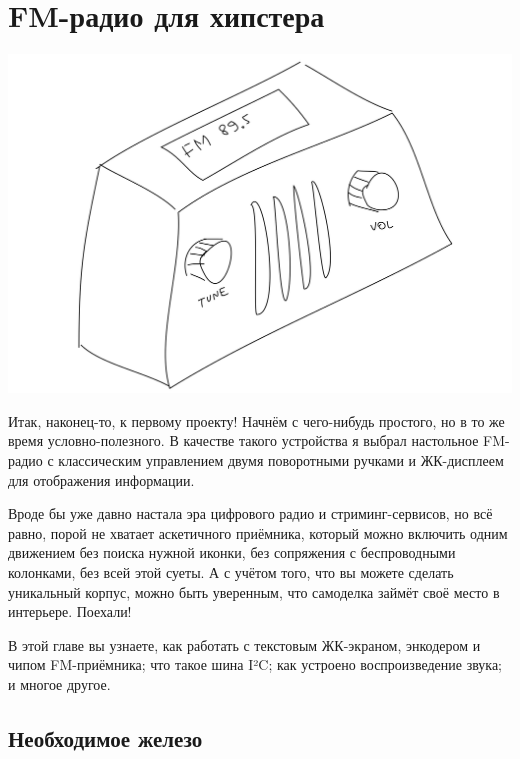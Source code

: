 \chapter{FM-радио для хипстера}

\includegraphics{sketches/fm-radio}

%
%

Итак, наконец-то, к первому проекту! Начнём с чего-нибудь простого, но в то же время условно-полезного. В качестве такого устройства я выбрал настольное FM-радио с классическим управлением двумя поворотными ручками и ЖК-дисплеем для отображения информации.

Вроде бы уже давно настала эра цифрового радио и стриминг-сервисов, но всё равно, порой не хватает аскетичного приёмника, который можно включить одним движением без поиска нужной иконки, без сопряжения с беспроводными колонками, без всей этой суеты. А с учётом того, что вы можете сделать уникальный корпус, можно быть уверенным, что самоделка займёт своё место в интерьере. Поехали!


В этой главе вы узнаете, как работать с текстовым ЖК-экраном, энкодером и чипом FM-приёмника; что такое шина I²C; как устроено воспроизведение звука; и многое другое.

\section{Необходимое железо}

